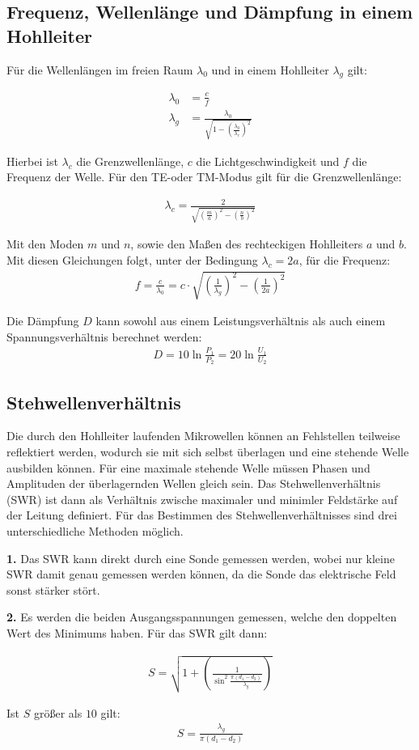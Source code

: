 \subsection{Frequenz, Wellenlänge und Dämpfung in einem Hohlleiter}
Für die Wellenlängen im freien Raum $\lambda_0$ und in einem Hohlleiter $\lambda_g$ gilt:

\begin{align}
  \lambda_0 &= \frac{c}{f} \\
  \lambda_g &= \frac{\lambda_0}{\sqrt{1- \left( \frac{\lambda_0}{\lambda_c} \right)^2}}
\end{align}

Hierbei ist $\lambda_c$ die Grenzwellenlänge, $c$ die Lichtgeschwindigkeit und $f$
die Frequenz der Welle. Für den TE-oder TM-Modus gilt für die
Grenzwellenlänge:

\begin{align}
  \lambda_c = \frac{2}{\sqrt{\left(\frac{m}{a} \right)^2 - \left(\frac{n}{b} \right)^2}}
\end{align}

Mit den Moden $m$ und $n$, sowie den Maßen des rechteckigen Hohlleiters $a$ und $b$.
Mit diesen Gleichungen folgt, unter der Bedingung $\lambda_c=2a$, für die Frequenz:
\begin{align}
  f = \frac{c}{\lambda_0} = c \cdot \sqrt{\left(\frac{1}{\lambda_g}\right)^2 - \left(\frac{1}{2a}\right)^2}
\end{align}


Die Dämpfung $D$ kann sowohl aus einem Leistungsverhältnis als auch einem Spannungsverhältnis berechnet werden:
\begin{align}
  D = 10  \ln{\frac{P_1}{P_2}} = 20 \ln{\frac{U_1}{U_2}}
\end{align}


\subsection{Stehwellenverhältnis}
Die durch den Hohlleiter laufenden Mikrowellen können an Fehlstellen teilweise reflektiert
werden, wodurch sie mit sich selbst überlagen und eine stehende Welle ausbilden können.
Für eine maximale stehende Welle müssen Phasen und Amplituden der überlagernden Wellen
gleich sein. Das Stehwellenverhältnis (SWR) ist dann als Verhältnis zwische maximaler
und minimler Feldstärke auf der Leitung definiert. Für das Bestimmen des Stehwellenverhältnisses
sind drei unterschiedliche Methoden möglich.

\textbf{1.} Das SWR kann direkt durch eine Sonde gemessen werden, wobei nur kleine SWR
damit genau gemessen werden können, da die Sonde das elektrische Feld sonst stärker
stört.

\textbf{2.} Es werden die beiden Ausgangsspannungen gemessen, welche den doppelten Wert
des Minimums haben. Für das SWR gilt dann:

\begin{align}
  S = \sqrt{1+  \left(\frac{1}{\sin^2{ \frac{\pi(d_1 - d_2)}{\lambda_g} }} \right) }
\end{align}

Ist $S$ größer als $10$ gilt:
\begin{align}
  S = \frac{\lambda_g}{\pi(d_1-d_2)}
\end{align}
